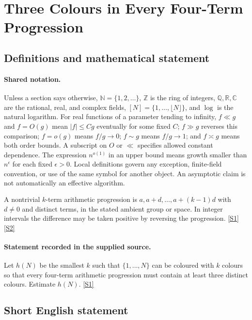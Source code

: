 \documentclass[11pt,a4paper]{article}
\newcommand{\N}{\mathbb{N}}
\newcommand{\Z}{\mathbb{Z}}
\newcommand{\Q}{\mathbb{Q}}
\newcommand{\R}{\mathbb{R}}
\newcommand{\C}{\mathbb{C}}
\newcommand{\sref}[2]{\hyperlink{source:#1:#2}{[S#2]}}
\begin{document}
\section{Three Colours in Every Four-Term Progression}\label{statement}


\subsection{Definitions and mathematical statement}

\paragraph{Shared notation.}Unless a section says otherwise, $\N=\{1,2,\ldots\}$,
$\Z$ is the ring of integers, $\Q,\R,\C$ are the rational, real, and complex
fields, $[N]=\{1,\ldots,\lfloor N\rfloor\}$, and $\log$ is the natural
logarithm. For real functions of a parameter tending to infinity,
$f\ll g$ and $f=O(g)$ mean $|f|\leq Cg$ eventually for some fixed $C$;
$f\gg g$ reverses this comparison; $f=o(g)$ means $f/g\to0$;
$f\sim g$ means $f/g\to1$; and $f\asymp g$ means both order bounds.
A subscript on $O$ or $\ll$ specifies allowed constant dependence.
The expression $n^{o(1)}$ in an upper bound means growth smaller than
$n^\epsilon$ for each fixed $\epsilon>0$. Local definitions govern any
exception, finite-field convention, or use of the same symbol for another
object. An asymptotic claim is not automatically an effective algorithm.



A nontrivial $k$-term arithmetic progression is $a,a+d,\ldots,a+(k-1)d$ with $d\ne0$ and distinct terms, in the stated ambient group or space. In integer intervals the difference may be taken positive by reversing the progression. \sref{statement}{1} \sref{statement}{2}

\paragraph{Statement recorded in the supplied source.}
Let $h(N)$ be the smallest $k$ such that $\{1,\ldots,N\}$ can be coloured with $k$ colours so that every four-term arithmetic progression must contain at least three distinct colours. Estimate $h(N)$. \sref{statement}{1}

\subsection{Short English statement}
\end{document}
